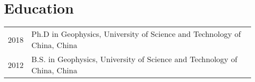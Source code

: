 \section*{Education}
\begin{tabular}{p{} p{}}
2018 & Ph.D in Geophysics, University of Science and Technology of China, China \\
2012 & B.S. in Geophysics, University of Science and Technology of China, China
\end{tabular}
